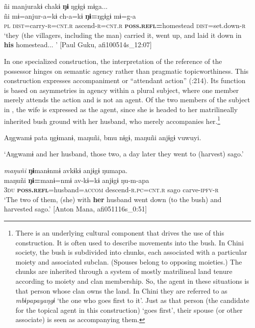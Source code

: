 \documentclass[output=paper]{langscibook}
\begin{document}
\glll ñi manjurakɨ   chakɨ \textbf{ŋɨ} ŋgɨgɨ   mɨga...\\
ñi mɨ=anjur-a=kɨ  ch-a=kɨ  \textbf{ŋɨ=}ŋgɨgɨ   mɨ=g-a\\
\textsc{pl}  \textsc{dist}=carry-\textsc{r=cnt.r}  ascend-\textsc{r=cnt.r}  \textbf{\textsc{poss.refl}}\textbf{=}homestead  \textsc{dist}=set.down-\textsc{r}\\
\glt `they (the villagers, including the man) carried it, went up, and laid it down in \textbf{his} homestead... ' [Paul Guku, afi100514s\_12:07]
\z


In one specialized construction, the interpretation of the reference of the possessor hinges on semantic agency rather than pragmatic topicworthiness. This construction expresses accompaniment or “attendant action” (\citealt{ZaliznjakShmelev2007}:214). Its function is based on asymmetries in agency within a plural subject, where one member merely attends the action and is not an agent. Of the two members of the subject in , the wife is expressed as the agent, since she is headed to her matrilineally inherited bush ground with her husband, who merely accompanies her.\footnote{There is an underlying cultural component that drives the use of this construction. It is often used to describe movements into the bush. In Chini society, the bush is subdivided into chunks, each associated with a particular moiety and associated subclan. (Spouses belong to opposing moieties.) The chunks are inherited through a system of mostly matrilineal land tenure according to moiety and clan membership. So, the agent in these situations is that person whose clan owns the land. In Chini they are referred to as \textit{mbɨpapayaŋgɨ} ‘the one who goes first to it’. Just as that person (the candidate for the topical agent in this construction) ‘goes first’, their spouse (or other associate) is seen as accompanying them.}

\ea\label{ex:brooks:20}
Aŋgwamɨ pata ŋgɨmanɨ, maŋuñi, bmu nɨgɨ, maŋuñi anjɨgɨ vuwuyi.


\glt `Aŋgwamɨ and her husband, those two, a day later they went to (harvest) sago.'

\glll \textit{maŋuñi} \textbf{ŋɨ}manɨnmɨ avkɨkɨ anjɨgɨ  ŋumapa.\\
maŋuñi \textbf{ŋɨ=}manɨ=nmɨ av-kɨ=kɨ anjɨgɨ  ŋu-m-apa\\
\textsc{3du} \textbf{\textsc{poss.refl}}=husband=\textsc{accom} descend-\textsc{r.pc=cnt.r}  sago  carve-\textsc{ipfv-r}\\
\glt `The two of them, (she) with \textbf{her} husband went down (to the bush) and harvested sago.' [Anton Mana, afi051116s\_0:51]
\z
\end{document}
